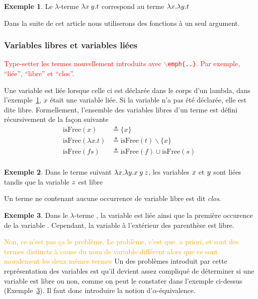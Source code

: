 \documentclass {article}
\theoremstyle{definition}
\newtheorem{example}{Exemple}
\theoremstyle{remark}
\newcommand{\todo}[1]{\textcolor{red}{#1}}
\newcommand{\attention}[1]{\textcolor{orange}{#1}}
\begin{document}
\begin{example}
  \label{example:id}
  Le \(\lambda\)-terme $\lambda x\: y. t$ correspond au terme $\lambda x. \lambda y. t$  
\end{example} 

Dans la suite de cet article nous utiliserons des fonctions à un seul
argument.

\subsubsection{Variables libres et variables liées}

\newcommand{\IsFree}{\mathrm{isFree}}


\todo{Type-setter les termes nouvellement introduits avec
  \texttt{$\backslash$emph\{..\}}. Par exemple, ``liée'', ``libre'' et
  ``clos''.}

Une variable est liée lorsque celle ci est déclarée dans le corps d'un
lambda, dans l'exemple~\ref{example:id}, $x$ était une variable liée.
Si la variable n'a pas été déclarée, elle est dite
libre. Formellement, l'ensemble des variables libres d'un terme est
défini récursivement de la façon suivante
%
\begin{align*}
  \IsFree(x) &\triangleq \{x\} \\
  \IsFree(\lambda x. t) &\triangleq \IsFree(t) \backslash \{x\} \\
  \IsFree(f s) &\triangleq \IsFree(f) \cup \IsFree(s) \\
\end{align*}


\begin{example}
  Dans le terme suivant \(\lambda x. \lambda y. x\:y\:z\), 
  les variables $x$ et $y$ sont liées tandis que la variable $z$ est libre 
\end{example}


Un terme ne contenant aucune occurrence de variable libre est dit \emph{clos}.

\begin{example}  
  \label{example:ouvert-clos}  
  Dans le $\lambda$-terme , la
  variable  est liée ainsi que la première occurence de la
  variable . Cependant, la variable  à l'extérieur des
  parenthèse est libre.
\end{example}

\label{problemelibreliee}
\attention{Non, ce n'est pas ça le problème. Le problème, c'est que, a
  priori, \Lam{\Var{x}}{\Var{x}} et \Lam{\Var{y}}{\Var{y}} sont des
  termes distincts à cause du nom de variable différent alors que ce
  sont moralement les deux mêmes termes}
Un des problèmes introduit par cette représentation des variables est qu'il devient assez compliqué de déterminer si une variable est libre ou non, comme on peut le constater dans l'exemple ci-dessus (Exemple~\ref{example:ouvert-clos}). Il faut donc introduire la notion 
d'$\alpha$-équivalence.
\end{document}
